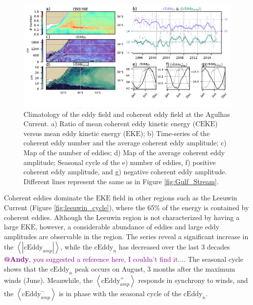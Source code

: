 \documentclass[draft,linenumbers]{agujournal2019}
\newcommand{\MEKE}{\overline{\textrm{EKE}}}
\newcommand{\EKE}{\textrm{EKE}}
\newcommand{\MCEKE}{\overline{\textrm{CEKE}}}
\newcommand{\cEddy}{\textrm{cEddy}}
\begin{document}
	\begin{figure}
	    \centering
	    \includegraphics[width=1\textwidth]{figures/regional_ratios_and_stats_V3_2.pdf}
	    \caption{Climatology of the eddy field and coherent eddy field at the Agulhas Current. a) Ratio of mean coherent eddy kinetic energy ($\MCEKE$) versus mean eddy kinetic energy ($\MEKE$); b) Time-series of the coherent eddy number and the average coherent eddy amplitude; c) Map of the number of eddies; d) Map of the average coherent eddy amplitude; Seasonal cycle of the e) number of eddies, f) positive coherent eddy amplitude, and g) negative coherent eddy amplitude. Different lines represent the same as in Figure \ref{fig:Gulf_Stream}.}
	    \label{fig:Agulhas}
	\end{figure}


	Coherent eddies dominate the $\EKE$ field in other regions such as the Leeuwin Current (Figure \ref{fig:leeuwin_cycle}), where the 65\% of the energy is contained by coherent eddies. 
	Although the Leeuwin region is not characterized by having a large $\EKE$, however, a considerable abundance of eddies and large eddy amplitudes are observable in the region. 
	The series reveal a significant increase in the $\left<|\cEddy_{amp}|\right>$, while the $\cEddy_{n}$ has decreased over the last 3 decades \citep{}\textcolor{purple}{\textbf{@Andy}, you suggested a reference here, I couldn't find it...}. The seasonal cycle shows that the $\cEddy_{n}$ peak occurs on August, 3 months after the maximum winds (June). Meanwhile, the $\left<\cEddy_{amp}^+\right>$ responds in synchrony to winds, and the $\left<\cEddy_{amp}^-\right>$ is in phase with the seasonal cycle of the $\cEddy_{n}$. 
 		
\end{document}
